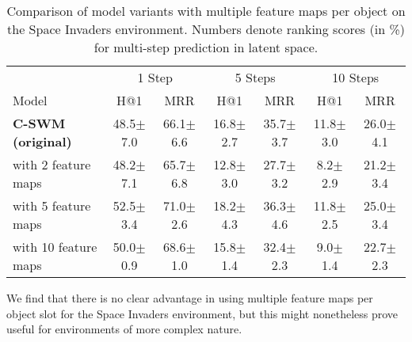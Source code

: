\documentclass{article} %
\begin{document}
\begin{table}[htp!]
\centering
\caption{\label{tab:results_feaure_maps}Comparison of model variants with multiple feature maps per object on the Space Invaders environment. Numbers denote ranking scores (in \%) for multi-step prediction in latent space.}
\begin{tabular}{lcccccc}
\toprule
   & \multicolumn{2}{c}{1 Step} & \multicolumn{2}{c}{5 Steps} & \multicolumn{2}{c}{10 Steps} \\ \cmidrule(lr){2-3} \cmidrule(lr){4-5} \cmidrule(lr){6-7}
Model & H@1 & MRR & H@1 & MRR & H@1 & MRR      \\ \midrule
{\bf C-SWM (original)}& {48.5}{\color{lightgrey}\tiny$\pm$7.0}  & { 66.1}{\color{lightgrey}\tiny$\pm$6.6} & {16.8}{\color{lightgrey}\tiny$\pm$2.7}  & { 35.7}{\color{lightgrey}\tiny$\pm$3.7} & {11.8}{\color{lightgrey}\tiny$\pm$3.0}  & { 26.0}{\color{lightgrey}\tiny$\pm$4.1} \\
with 2 feature maps & 48.2{\color{lightgrey}\tiny$\pm$7.1}  & 65.7{\color{lightgrey}\tiny$\pm$6.8} & 12.8{\color{lightgrey}\tiny$\pm$3.0}  & 27.7{\color{lightgrey}\tiny$\pm$3.2} & 8.2{\color{lightgrey}\tiny$\pm$2.9}  & 21.2{\color{lightgrey}\tiny$\pm$3.4} \\
with 5 feature maps & 52.5{\color{lightgrey}\tiny$\pm$3.4}  & 71.0{\color{lightgrey}\tiny$\pm$2.6} & 18.2{\color{lightgrey}\tiny$\pm$4.3}  & 36.3{\color{lightgrey}\tiny$\pm$4.6} & 11.8{\color{lightgrey}\tiny$\pm$2.5}  & 25.0{\color{lightgrey}\tiny$\pm$3.4} \\
with 10 feature maps & 50.0{\color{lightgrey}\tiny$\pm$0.9}  & 68.6{\color{lightgrey}\tiny$\pm$1.0} & 15.8{\color{lightgrey}\tiny$\pm$1.4}  & 32.4{\color{lightgrey}\tiny$\pm$2.3} & 9.0{\color{lightgrey}\tiny$\pm$1.4}  & 22.7{\color{lightgrey}\tiny$\pm$2.3} \\
\bottomrule
\end{tabular}
\end{table}
We find that there is no clear advantage in using multiple feature maps per object slot for the Space Invaders environment, but this might nonetheless prove useful for environments of more complex nature.
\end{document}
